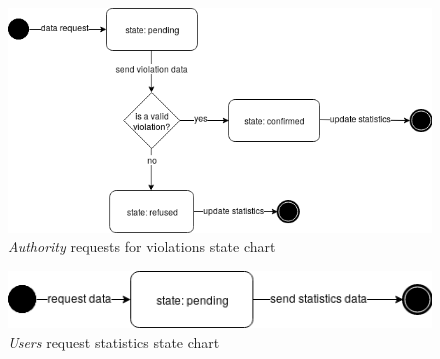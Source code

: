\documentclass{article}
\begin{document}
\begin{figure}[h!]
    \centering
    \includegraphics[scale=0.5]{img/state_charts/authority_request.png}
    \caption{\textit{Authority} requests for violations state chart}
\end{figure}

\begin{figure}[h!]
    \centering
    \includegraphics[scale=0.5]{img/state_charts/citizen_request.png}
    \caption{\textit{Users} request statistics state chart}
\end{figure}
\end{document}
